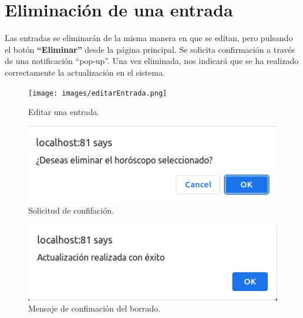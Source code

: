 \documentclass[12pt, twoside]{report}
\begin{document}
\section*{Eliminación de una entrada}
\noindent Las entradas se eliminarán de la misma manera en que se editan, pero pulsando el botón \textbf{``Eliminar''} desde la página principal. Se solicita confirmación a través de una notificación ``pop-up''. Una vez eliminada, nos indicará que se ha realizado correctamente la actualización en el sistema.
\begin{figure}[h]
\begin{center}
\texttt{[image: images/editarEntrada.png]}
\end{center}
\caption{\label{inicio} Editar una entrada.}
\end{figure}
\begin{figure}[h]
\begin{center}
\includegraphics[scale=0.65]{images/confirmación_borrar.png}
\end{center}
\caption{\label{inicio} Solicitud de confifación.}
\end{figure}
\begin{figure}[h]
\begin{center}
\includegraphics[scale=0.65]{images/actualización.png}
\end{center}
\caption{\label{inicio} Mensaje de confimación del borrado.}
\end{figure}
\clearpage
\end{document}
